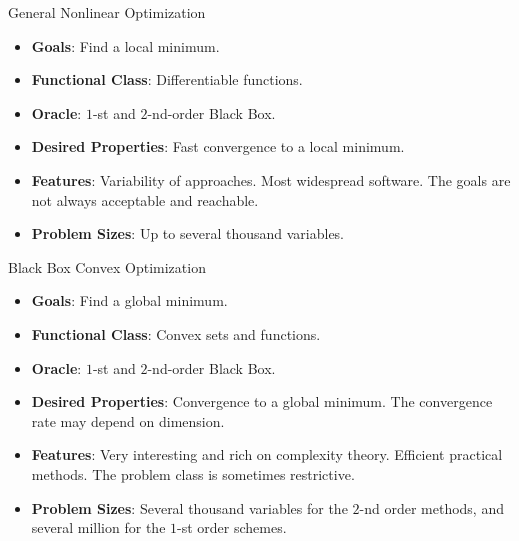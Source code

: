\begin{colorboxnote}{General Nonlinear Optimization}
    \begin{itemize}
        \item \textbf{Goals}: Find a local minimum.
        \item \textbf{Functional Class}: Differentiable functions.
        \item \textbf{Oracle}: \(1\)-st and \(2\)-nd-order Black Box.
        \item \textbf{Desired Properties}: Fast convergence to a local minimum.
        \item \textbf{Features}: Variability of approaches. Most widespread software. The goals are not always acceptable and reachable.
        \item \textbf{Problem Sizes}: Up to several thousand variables.
    \end{itemize}
\end{colorboxnote}

\begin{colorboxnote}{Black Box Convex Optimization}
    \begin{itemize}
        \item \textbf{Goals}: Find a global minimum.
        \item \textbf{Functional Class}: Convex sets and functions.
        \item \textbf{Oracle}: \(1\)-st and \(2\)-nd-order Black Box.
        \item \textbf{Desired Properties}: Convergence to a global minimum. The convergence rate may depend on dimension.
        \item \textbf{Features}: Very interesting and rich on complexity theory. Efficient practical methods. The problem class is sometimes restrictive.
        \item \textbf{Problem Sizes}: Several thousand variables for the \(2\)-nd order methods, and several million for the \(1\)-st order schemes.
    \end{itemize}
\end{colorboxnote}

